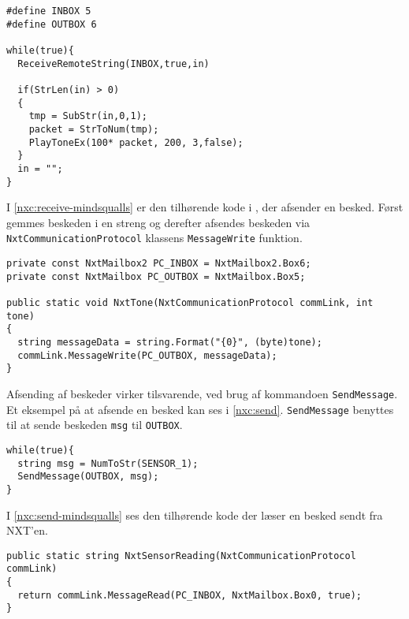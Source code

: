 \begin{lstlisting}[style=c,label=nxc:receive,caption={Et eksempel på at modtage beskeder over bluetooth}]
#define INBOX 5
#define OUTBOX 6

while(true){
  ReceiveRemoteString(INBOX,true,in)
  
  if(StrLen(in) > 0)
  {
    tmp = SubStr(in,0,1);
    packet = StrToNum(tmp);
    PlayToneEx(100* packet, 200, 3,false);
  }
  in = "";
}
\end{lstlisting}

I \cref{nxc:receive-mindsqualls} er den tilhørende kode i \mindsqualls, der afsender en besked.
Først gemmes beskeden i en streng og derefter afsendes beskeden via \lstinline[style=csharp]!NxtCommunicationProtocol! klassens \lstinline[style=csharp]!MessageWrite! funktion.

\begin{lstlisting}[style=c,breaklines=true, label=nxc:receive-mindsqualls,caption={\mindsqualls kode der afsender en besked}]
private const NxtMailbox2 PC_INBOX = NxtMailbox2.Box6;
private const NxtMailbox PC_OUTBOX = NxtMailbox.Box5;

public static void NxtTone(NxtCommunicationProtocol commLink, int tone)
{
  string messageData = string.Format("{0}", (byte)tone);
  commLink.MessageWrite(PC_OUTBOX, messageData);
}
\end{lstlisting}

Afsending af beskeder virker tilsvarende, ved brug af kommandoen \lstinline[style=c]|SendMessage|.
Et eksempel på at afsende en besked kan ses i \cref{nxc:send}.
\lstinline[style=c]|SendMessage| benyttes til at sende beskeden \lstinline[style=c]|msg| til \lstinline[style=c]!OUTBOX!.

\begin{lstlisting}[style=c,label=nxc:send,caption={Eksempel på afsending af besked}]
while(true){
  string msg = NumToStr(SENSOR_1);
  SendMessage(OUTBOX, msg);
}
\end{lstlisting}

I \cref{nxc:send-mindsqualls} ses den tilhørende \mindsqualls kode der læser en besked sendt fra NXT'en.

\begin{lstlisting}[style=c,breaklines=true,label=nxc:send-mindsqualls,caption={\mindsqualls kode der læser en besked sendt fra NXT'en}]
public static string NxtSensorReading(NxtCommunicationProtocol commLink)
{
  return commLink.MessageRead(PC_INBOX, NxtMailbox.Box0, true);
}
\end{lstlisting}
